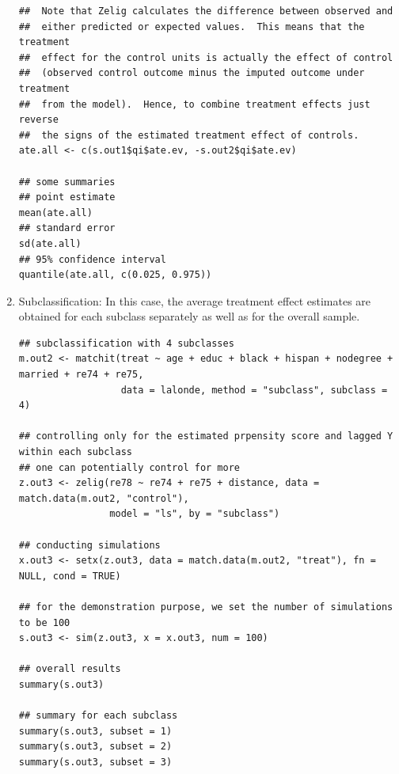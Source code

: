 \documentclass[oneside,letterpaper,titlepage]{article}
\begin{document}
\begin{enumerate}
\begin{verbatim}
##  Note that Zelig calculates the difference between observed and
##  either predicted or expected values.  This means that the treatment
##  effect for the control units is actually the effect of control
##  (observed control outcome minus the imputed outcome under treatment
##  from the model).  Hence, to combine treatment effects just reverse
##  the signs of the estimated treatment effect of controls.
ate.all <- c(s.out1$qi$ate.ev, -s.out2$qi$ate.ev)

## some summaries
## point estimate
mean(ate.all)
## standard error
sd(ate.all)
## 95% confidence interval
quantile(ate.all, c(0.025, 0.975))
\end{verbatim}
  
\item Subclassification: In this case, the average treatment effect
  estimates are obtained for each subclass separately as well as
  for the overall sample.

\begin{verbatim}
## subclassification with 4 subclasses
m.out2 <- matchit(treat ~ age + educ + black + hispan + nodegree + married + re74 + re75,  
                  data = lalonde, method = "subclass", subclass = 4)

## controlling only for the estimated prpensity score and lagged Y within each subclass
## one can potentially control for more
z.out3 <- zelig(re78 ~ re74 + re75 + distance, data = match.data(m.out2, "control"), 
                model = "ls", by = "subclass")

## conducting simulations
x.out3 <- setx(z.out3, data = match.data(m.out2, "treat"), fn = NULL, cond = TRUE)

## for the demonstration purpose, we set the number of simulations to be 100
s.out3 <- sim(z.out3, x = x.out3, num = 100)

## overall results
summary(s.out3) 

## summary for each subclass
summary(s.out3, subset = 1) 
summary(s.out3, subset = 2) 
summary(s.out3, subset = 3) 
\end{verbatim}
  
%
\end{enumerate}
\end{document}
